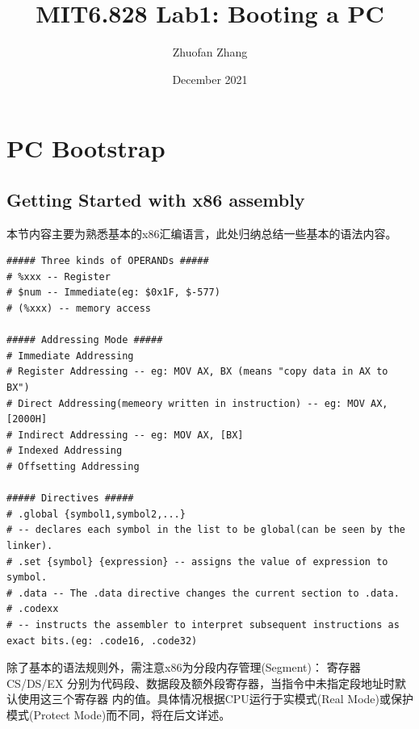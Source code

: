 \documentclass[12pt, letterpaper]{report}
\title{MIT6.828 Lab1: Booting a PC}
\author{Zhuofan Zhang}
\date{December 2021}
\begin{document}
\maketitle
\renewcommand\contentsname{\Huge Contents}
\tableofcontents{}


\newpage
{}
\chapter[\Large PC Bootstrap]{PC Bootstrap}
\section[\large Getting Started with x86 assembly]{Getting Started with x86 assembly}
本节内容主要为熟悉基本的x86汇编语言，此处归纳总结一些基本的语法内容。
\lstset{style=AssemblyStyle}
\setmainfont{Consolas}
\begin{lstlisting}
##### Three kinds of OPERANDs #####
# %xxx -- Register
# $num -- Immediate(eg: $0x1F, $-577)
# (%xxx) -- memory access

##### Addressing Mode #####
# Immediate Addressing
# Register Addressing -- eg: MOV AX, BX (means "copy data in AX to BX")
# Direct Addressing(memeory written in instruction) -- eg: MOV AX, [2000H]
# Indirect Addressing -- eg: MOV AX, [BX]
# Indexed Addressing
# Offsetting Addressing

##### Directives #####
# .global {symbol1,symbol2,...} 
# -- declares each symbol in the list to be global(can be seen by the linker).
# .set {symbol} {expression} -- assigns the value of expression to symbol.
# .data -- The .data directive changes the current section to .data.
# .codexx 
# -- instructs the assembler to interpret subsequent instructions as exact bits.(eg: .code16, .code32)
\end{lstlisting}
\setmainfont{Times New Roman}

除了基本的语法规则外，需注意x86为分段内存管理(Segment)：
寄存器 CS/DS/EX 分别为代码段、数据段及额外段寄存器，当指令中未指定段地址时默认使用这三个寄存器
内的值。具体情况根据CPU运行于实模式(Real Mode)或保护模式(Protect Mode)而不同，将在后文详述。 \par

\end{document}
